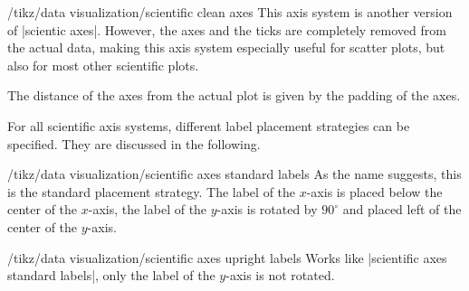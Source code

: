 \begin{key}{/tikz/data visualization/scientific clean axes}
  This axis system is another version of |scientic axes|. However, the
  axes and the ticks are completely removed from the actual data,
  making this axis system especially useful for scatter plots, but
  also for most other scientific plots.
      
\begin{codeexample}[]
\end{codeexample}

  The distance of the axes from the actual plot is given by the
  padding of the axes.
\end{key}


For all scientific axis systems, different label placement strategies
can be specified. They are discussed in the following.


\begin{key}{/tikz/data visualization/scientific axes standard labels}
  As the name suggests, this is the standard placement strategy. The
  label of the $x$-axis is placed below the center of the $x$-axis,
  the label of the $y$-axis is rotated by $90^\circ$ and placed left
  of the center of the $y$-axis.
\begin{codeexample}[]
\end{codeexample}
\end{key}

\begin{key}{/tikz/data visualization/scientific axes upright labels}
  Works like |scientific axes standard labels|, only the label of the
  $y$-axis is not rotated.
\begin{codeexample}[]
\end{codeexample}
\end{key}


